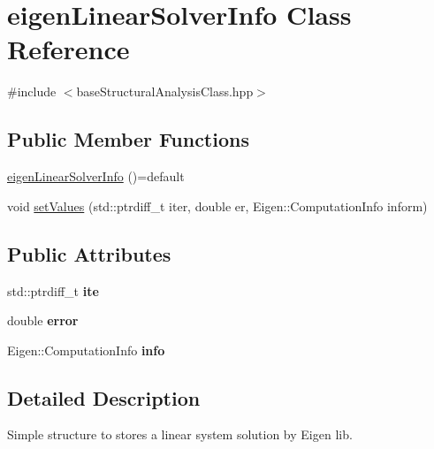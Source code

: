 \hypertarget{classeigen_linear_solver_info}{}\section{eigen\+Linear\+Solver\+Info Class Reference}
\label{classeigen_linear_solver_info}


{\ttfamily \#include $<$base\+Structural\+Analysis\+Class.\+hpp$>$}

\subsection*{Public Member Functions}
\begin{DoxyCompactItemize}
\item 
\mbox{\hyperlink{classeigen_linear_solver_info_a7188b8fac261f6f5c2c268fbc4334325}{eigen\+Linear\+Solver\+Info}} ()=default
\item 
void \mbox{\hyperlink{classeigen_linear_solver_info_aeec430481779fd1c759e0f33f0b02c4f}{set\+Values}} (std\+::ptrdiff\+\_\+t iter, double er, Eigen\+::\+Computation\+Info inform)
\end{DoxyCompactItemize}
\subsection*{Public Attributes}
\begin{DoxyCompactItemize}
\item 
\mbox{\label{classeigen_linear_solver_info_a74d85f3c4e27ee7caf995c18ac6854a4}} 
std\+::ptrdiff\+\_\+t {\bfseries ite}
\item 
\mbox{\label{classeigen_linear_solver_info_a752aa62422a4d8ad6cb44d8d56fc6504}} 
double {\bfseries error}
\item 
\mbox{\label{classeigen_linear_solver_info_a1aecf24673f0238af235b3c80f4c89de}} 
Eigen\+::\+Computation\+Info {\bfseries info}
\end{DoxyCompactItemize}


\subsection{Detailed Description}
Simple structure to stores a linear system solution by Eigen lib. 

